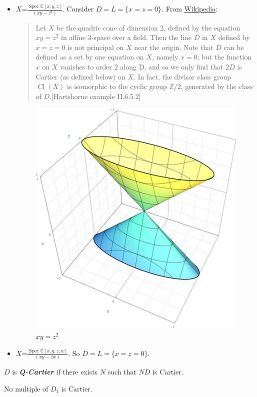 \documentclass{article}
\newcommand{\Z}{\mathbb{Z}}
\newcommand{\C}{\mathbb{C}}
\DeclareMathOperator{\Spec}{Spec}
\begin{document}
\begin{example}\leavevmode
	\begin{itemize}
		\item $X$=$\frac{\Spec\C[x,y,z]}{(xy-z^2)}$. Consider $D=L=\{x=z=0\}$. From \href{https://en.wikipedia.org/wiki/Divisor_(algebraic_geometry)}{Wikipedia}:
		
		\begin{quote}
			Let $X$ be the quadric cone of dimension 2, defined by the equation $xy = z^2$ in affine 3-space over a field. Then the line $D$ in $X$ defined by $x = z = 0$ is not principal on $X$ near the origin. Note that $D$ can be defined as a set by one equation on $X$, namely $x = 0$; but the function $x$ on $X$ vanishes to order 2 along D, and so we only find that $2D$ is Cartier (as defined below) on $X$. In fact, the divisor class group $\operatorname{Cl}(X)$ is isomorphic to the cyclic group $\Z/2$, generated by the class of $D$.[Hartshorne example II.6.5.2]
		\end{quote}
		\begin{figure}[H]
			\centering
			\includegraphics[width=0.4\linewidth]{divisor}
			\caption{$xy=z^2$}
			\label{fig:divisor}
		\end{figure}
		
		\item $X$=$\frac{\Spec\C[x,y,z,w]}{(xy-zw)}$. So $D=L=\{x=z=0\}$.
	\end{itemize}
\end{example}
\begin{defn}
	$D$ is \textbf{\textit{Q-Cartier}} if there exists $N$ such that $ND$ is Cartier.
\end{defn}
\begin{prop}
	No multiple of $D_1$ is Cartier.
\end{prop}
\end{document}
